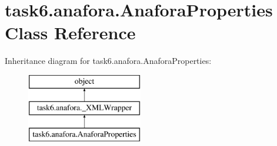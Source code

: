 \hypertarget{classtask6_1_1anafora_1_1AnaforaProperties}{}\section{task6.\+anafora.\+Anafora\+Properties Class Reference}
\label{classtask6_1_1anafora_1_1AnaforaProperties}
Inheritance diagram for task6.\+anafora.\+Anafora\+Properties\+:\begin{figure}[H]
\begin{center}
\leavevmode
\includegraphics[height=3.000000cm]{classtask6_1_1anafora_1_1AnaforaProperties}
\end{center}
\end{figure}

